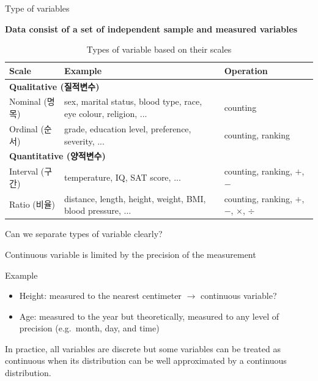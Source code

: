 \documentclass[9pt,ignorenonframetext,xcolor=dvipsnames]{beamer}
\providecommand{\tightlist}{%
  \setlength{\itemsep}{0pt}\setlength{\parskip}{0pt}}
\newlength{\wideitemsep}
\let\olditem\item
\renewcommand{\item}{\setlength{\itemsep}{\wideitemsep}\olditem}
\begin{document}
\begin{frame}{Type of variables}

\textbf{Data consist of a set of independent sample and measured variables}

\begin{table}
  \centering
  \caption{Types of variable based on their scales}
  \begingroup\footnotesize
  \begin{tabular}{lp{12em}p{8em}}
    \toprule
  \textbf{Scale}  &  \textbf{Example}                                                & \textbf{Operation} \\
    \midrule 
  \multicolumn{3}{L{5cm}}{\textbf{Qualitative (질적변수)}} \\
  \hspace{2.5mm} Nominal (명목)  & sex, marital status, blood type, race, eye colour, religion, ... & counting          \\ 
  \hspace{2.5mm} Ordinal (순서)  & grade, education level, preference, severity, ...                & counting, ranking \\
  \multicolumn{3}{L{5cm}}{\textbf{Quantitative (양적변수)}} \\
  \hspace{2.5mm} Interval (구간) & temperature, IQ, SAT score, ...                                  & counting, ranking, $+$, $-$ \\
  \hspace{2.5mm} Ratio (비율)    & distance, length, height, weight, BMI, blood pressure, ...       & counting, ranking, $+$, $-$, $\times$, $\div$ \\
  \bottomrule
  \end{tabular}
  \endgroup
\end{table}

\end{frame}

\begin{frame}{Can we separate types of variable clearly?}

Continuous variable is limited by the precision of the measurement

\begin{block}{Example}

\begin{itemize}
\tightlist
\item
  Height: measured to the nearest centimeter \(\rightarrow\) continuous
  variable?
\item
  Age: measured to the year but theoretically, measured to any level of
  precision (e.g.~month, day, and time)
\end{itemize}

\begin{mdframed}[backgroundcolor = gray!30]
In practice, all variables are discrete but some variables can be treated as continuous when its distribution can be well approximated by a continuous distribution.
\end{mdframed}

\end{block}

\end{frame}
\end{document}
